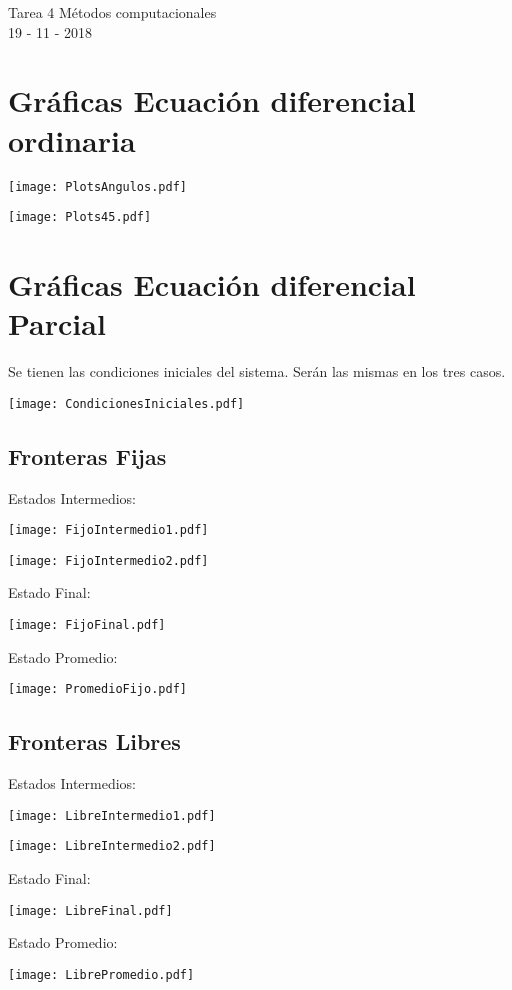 \documentclass[11pt,letterpaper]{exam}
\begin{document}
\begin{center}
{\Large Tarea 4 Métodos computacionales} \\
19 - 11 - 2018\\
\end{center}


\noindent
\section{Gr\'aficas Ecuación diferencial ordinaria}
\begin{center}
\texttt{[image: PlotsAngulos.pdf]} 
\end{center}
\begin{center}
\texttt{[image: Plots45.pdf]} 
\end{center}

\noindent
\section{Gr\'aficas Ecuación diferencial Parcial}
Se tienen las condiciones iniciales del sistema. Serán las mismas en los tres casos.
\begin{center}
\texttt{[image: CondicionesIniciales.pdf]} 
\end{center}
\subsection{Fronteras Fijas}
Estados Intermedios:
\begin{center}
\texttt{[image: FijoIntermedio1.pdf]} 
\end{center}
\begin{center}
\texttt{[image: FijoIntermedio2.pdf]} 
\end{center}
Estado Final:
\begin{center}
\texttt{[image: FijoFinal.pdf]} 
\end{center}
Estado Promedio:
\begin{center}
\texttt{[image: PromedioFijo.pdf]} 
\end{center}
\subsection{Fronteras Libres}
Estados Intermedios:
\begin{center}
\texttt{[image: LibreIntermedio1.pdf]} 
\end{center}
\begin{center}
\texttt{[image: LibreIntermedio2.pdf]} 
\end{center}
Estado Final:
\begin{center}
\texttt{[image: LibreFinal.pdf]} 
\end{center}
Estado Promedio:
\begin{center}
\texttt{[image: LibrePromedio.pdf]} 
\end{center}
\end{document}
